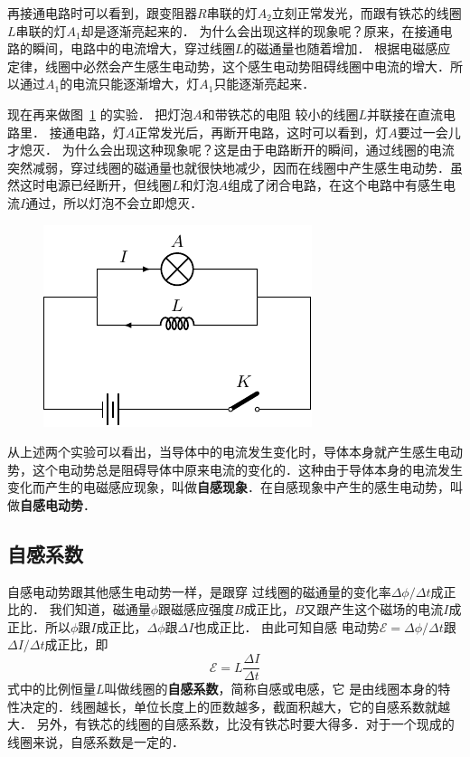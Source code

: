再接通电路时可以看到，跟变阻器$R$串联的灯$A_2$立刻正常发光，而跟有铁芯的线圈$L$串联的灯$A_1$却是逐渐亮起来的．
为什么会出现这样的现象呢？原来，在接通电路的瞬间，电路中的电流增大，穿过线圈$L$的磁通量也随着增加．
根据电磁感应定律，线圈中必然会产生感生电动势，这个感生电动势阻碍线圈中电流的增大．所以通过$A_1$的电流只能逐渐增大，灯$A_1$只能逐渐亮起来．


现在再来做图~\ref{fig_C_2-26} 的实验．
把灯泡$A$和带铁芯的电阻
较小的线圈$L$并联接在直流电路里．
接通电路，灯$A$正常发光后，再断开电路，这时可以看到，灯$A$要过一会儿才熄灭．
为什么会出现这种现象呢？这是由于电路断开的瞬间，通过线圈的电流突然减弱，穿过线圈的磁通量也就很快地减少，因而在线圈中产生感生电动势．虽然这时电源已经断开，但线圈$L$和灯泡$A$组成了闭合电路，在这个电路中有感生电流$I$通过，所以灯泡不会立即熄灭．
\begin{figure}[htbp]
	\centering
	\includegraphics{fig/C/2-26.pdf}
	\caption{}\label{fig_C_2-26}
\end{figure}


从上述两个实验可以看出，当导体中的电流发生变化时，导体本身就产生感生电动势，这个电动势总是阻碍导体中原来电流的变化的．这种由于导体本身的电流发生变化而产生的电磁感应现象，叫做\textbf{自感现象}．在自感现象中产生的感生电动势，叫做\textbf{自感电动势}．

\subsection{自感系数}
自感电动势跟其他感生电动势一样，是跟穿
过线圈的磁通量的变化率$\Delta\phi/\Delta t$成正比的．
我们知道，磁通量$\phi$跟磁感应强度$B$成正比，$B$又跟产生这个磁场的电流$I$成正比．所以$\phi$跟$I$成正比，$\Delta \phi$跟$\Delta I$也成正比．
由此可知自感
电动势$\mathcal{E}=\Delta\phi/\Delta t$跟$\Delta I/\Delta t$成正比，即
\[\mathcal{E}=L\frac{\Delta I}{\Delta t}\]
式中的比例恒量$L$叫做线圈的\textbf{自感系数}，简称自感或电感，它
是由线圈本身的特性决定的．线圈越长，单位长度上的匝数越多，截面积越大，它的自感系数就越大．
另外，有铁芯的线圈的自感系数，比没有铁芯时要大得多．对于一个现成的线圈来说，自感系数是一定的．

